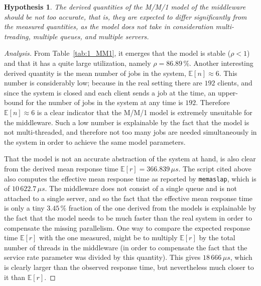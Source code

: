 \documentclass[11pt]{article}
\newtheorem{hyp}{Hypothesis}
\theoremstyle{definition}
\newenvironment{ana}[1][\proofname]{\begin{proof}[Analysis]}{\end{proof}}
\newcommand\E[1]{\mathbb E[#1]}
\renewcommand\t\texttt
\begin{document}
\begin{hyp}
    The derived quantities of the M/M/1 model of the middleware should be not too accurate, that is, they are expected to differ significantly from the measured quantities, as the model does not take in consideration multi-treading, multiple queues, and multiple servers.
\end{hyp}
\begin{ana}
    From Table~\ref{tab:1_MM1}, it emerges that the model is stable ($\rho<1$) and that it has a quite large utilization, namely $\rho=86.89\,\%$.
    Another interesting derived quantity is the mean number of jobs in the system, $\E n\approx6$.
    This number is considerably low; because in the real setting there are $192$ clients, and since the system is closed and each client sends a job at the time, an upper-bound for the number of jobs in the system at any time is $192$.
    Therefore $\E n\approx6$ is a clear indicator that the M/M/1 model is extremely unsuitable for the middleware.
    Such a low number is explainable by the fact that the model is not multi-threaded, and therefore not too many jobs are needed simultaneously in the system in order to achieve the same model parameters.
    
    That the model is not an accurate abstraction of the system at hand, is also clear from the derived mean response time $\E r=366.839\,\mu s$.
    The script cited above also computes the effective mean response time as reported by \t{memaslap}, which is of $10\,622.7\,\mu s$.
    The middleware does not consist of a single queue and is not attached to a single server, and so the fact that the effective mean response time is only a tiny $3.45\,\%$ fraction of the one derived from the models is explainable by the fact that the model needs to be much faster than the real system in order to compensate the missing parallelism.
    One way to compare the expected response time $\E r$ with the one measured, might be to multiply $\E r$ by the total number of threads in the middleware (in order to compensate the fact that the service rate parameter was divided by this quantity).
    This gives $18\,666\,\mu s$, which is clearly larger than the observed response time, but nevertheless much closer to it than $\E r$.
\end{ana}
\end{document}
